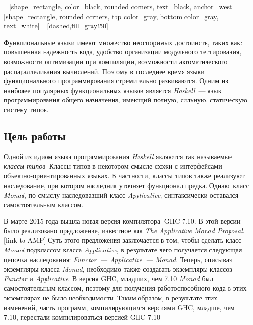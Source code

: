 



    =[shape=rectangle, color=black, rounded corners,%
    text=black, anchor=west]
    =[shape=rectangle, rounded corners,%
    top color=gray,%
    bottom color=gray, text=white]
    =[dashed,fill=gray!50]



\Intro

Функциональные языки имеют множество неоспоримых достоинств, таких как: повышенная надёжность кода, удобство организации модульного тестирования, возможности оптимизации при компиляции, возможности автоматического распараллеливания вычислений. Поэтому в последнее время языки функционального программирования стремительно развиваются. Одним из наиболее популярных функциональных языков является \textit{Haskell}~---  язык программирования общего назначения, имеющий полную, сильную, статическую систему типов.

\subsection*{Цель работы}
Одной из идиом языка программирования \textit{Haskell} являются так называемые \textit{классы типов}. Классы типов в некотором смысле схожи с интерфейсами  объектно-ориентированных языках. В частности, классы типов также реализуют наследование, при котором наследник уточняет функционал предка. Однако класс \textit{Monad}, по смыслу наследовавший класс \textit{Applicative}, синтаксически оставался самостоятельным классом.

В марте 2015 года вышла новая версия компилятора: GHC 7.10. В этой версии было реализовано предложение, известное как \textit{The Applicative Monad Proposal}.[link to AMP] Суть этого предложения заключается в том, чтобы сделать класс \textit{Monad} подклассом класса \textit{Applicative}, в результате чего получается следующая цепочка наследования: \textit{Functor~--- Applicative~--- Monad}. Теперь, описывая экземпляры класса \textit{Monad}, необходимо также создавать экземпляры классов \textit{Functor} и \textit{Applicative}. В версия GHC, младших, чем 7.10 \textit{Monad} был самостоятельным классом, поэтому для получения работоспособного кода в этих экземплярах не было необходимости. Таким образом, в результате этих изменений, часть программ, компилирующихся версиями GHC, младше, чем 7.10, перестали компилироваться версией GHC 7.10.

